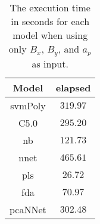 \begin{table}[!ht]
	\centering
	\begin{tabular}{|c|c|}
		\hline
		Model & elapsed \\ \hline
		svmPoly & $319.97$ \\ \hline
		C5.0 & $295.20$ \\ \hline
		nb & $121.73$ \\ \hline
		nnet & $465.61$ \\ \hline
		pls & $26.72$ \\ \hline
		fda & $70.97$ \\ \hline
		pcaNNet & $302.48$ \\ \hline
	\end{tabular}
	\caption{The execution time in seconds for each model when using only $B_{x}$, $B_{y}$, and $a_{p}$ as input.}
	\label{tab:time:xyap:total}
\end{table}
